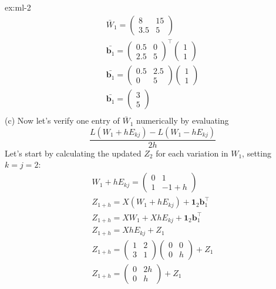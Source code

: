 \begin{solution}{ex:ml-2}
\[\begin{gathered}
      \bar W_1 = \begin{pmatrix}8&15\\3.5&5\end{pmatrix}\\
      \bar{\mathbf{b}_1}= \begin{pmatrix}0.5&0\\2.5&5\end{pmatrix}^{\!\top} \begin{pmatrix}1\\1\end{pmatrix}\\
      \bar{\mathbf{b}_1}= \begin{pmatrix}0.5&2.5\\0&5\end{pmatrix} \begin{pmatrix}1\\1\end{pmatrix}\\
      \bar{\mathbf{b}_1}= \begin{pmatrix}3\\5\end{pmatrix}\\
    \end{gathered}
  \]
  (c) Now let's verify one entry of $\bar W_1$ numerically by evaluating
  \[
    \frac{L(W_1+hE_{kj})-L(W_1-hE_{kj})}{2h}
  \]
  Let's start by calculating the updated $Z_2$ for each variation in $W_1$, setting $k=j=2$:
  \[
    \begin{gathered}
      W_1+hE_{kj}=\begin{pmatrix}0&1\\1&-1+h\end{pmatrix}\\
      Z_{1+h}=X(W_1+hE_{kj})+\mathbf{1}_2\mathbf{b}_1^{\!\top}\\
      Z_{1+h}=XW_1+XhE_{kj}+\mathbf{1}_2\mathbf{b}_1^{\!\top}\\
      Z_{1+h}=XhE_{kj}+Z_1\\
      Z_{1+h}=\begin{pmatrix}1&2\\3&1\end{pmatrix}\begin{pmatrix}0&0\\0&h\end{pmatrix}+Z_1\\
      Z_{1+h}=\begin{pmatrix}0&2h\\0&h\end{pmatrix}+Z_1\\

\end{gathered}\]
\end{solution}

